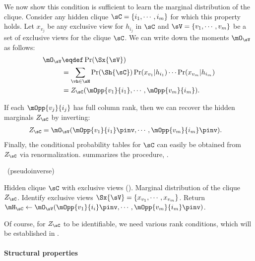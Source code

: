 We now show this condition is sufficient to learn the marginal
  distribution of the clique.
Consider any hidden clique $\sC = \{i_1, \cdots, i_m\}$ for which this property holds. Let
  $x_{v_j}$ be any exclusive view for $h_{i_j}$ in $\sC$ and $\sV
  = \{v_1, \cdots, v_m\}$ be a set of exclusive views for the clique $\sC$.
We can write down the moments $\mO_\sV$ as follows:
\begin{align*}
  \mO_\sV 
  &\eqdef \Pr(\Sx{\sV}) \\
      &= \sum_{\vh \in \sH} \Pr(\Sh{\sC}) 
          \Pr(x_{v_1} | h_{i_1}) \cdots \Pr(x_{v_m} | h_{i_m}) \\
    &= Z_{\sC}(\mOpp{v_1}{i_1},\cdots,\mOpp{v_m}{i_m}).
\end{align*}

If each $\mOpp{v_j}{i_j}$ has full column rank, then we can recover the
hidden marginals $Z_\sC$ by inverting:
\begin{align*}
  Z_{\sC} &= \mO_\sV(\mOpp{v_1}{i_1}\pinv,\cdots,\mOpp{v_m}{i_m}\pinv).
\end{align*}
Finally, the conditional probability tables for $\sC$ can easily be obtained from
  $Z_\sC$ via renormalization.
 summarizes the procedure, \LearnClique.

\begin{algorithm}
  \caption{\LearnClique~(pseudoinverse)}
  \label{algo:learnclique}
  \begin{algorithmic}
    \REQUIRE Hidden clique $\sC$ with exclusive views ().
    \ENSURE Marginal distribution of the clique $Z_\sC$.
      \STATE Identify exclusive views $\Sx{\sV} = \{x_{v_1}, \cdots, x_{v_m}\}$.
      \STATE Return $\mH_\sC \gets \mO_{\sV}( \mOpp{v_1}{i_i}\pinv, \cdots, {\mOpp{v_m}{i_m}}\pinv )$.
  \end{algorithmic}
\end{algorithm}
Of course, for $Z_{\sC}$ to be identifiable, we need various rank conditions,
which will be established in .

\paragraph{Structural properties}


